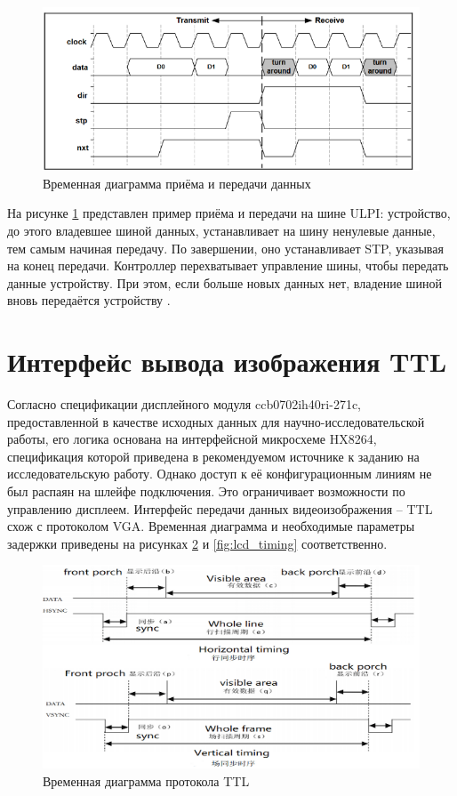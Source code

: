 \begin{figure}[ht]
    \centering
    \includegraphics[scale=0.5]{res/img/ulpi_in_out.png}
    \caption{Временная диаграмма приёма и передачи данных \cite{ulpi:specification}}
    \label{fig:ulpi_in_out}
\end{figure}

На рисунке \ref{fig:ulpi_in_out} представлен пример приёма и передачи на шине ULPI: устройство, до этого владевшее шиной данных, устанавливает на шину ненулевые данные, тем самым начиная передачу. По завершении, оно устанавливает STP, указывая на конец передачи. Контроллер перехватывает управление шины, чтобы передать данные устройству. При этом, если больше новых данных нет, владение шиной вновь передаётся устройству \cite{ulpi:specification}.

\section{Интерфейс вывода изображения TTL}
Согласно спецификации дисплейного модуля ccb0702ih40ri-271c, предоставленной в качестве исходных данных для научно-исследовательской работы, его логика основана на интерфейсной микросхеме HX8264, спецификация которой приведена в рекомендуемом источнике \cite{lcd:driver} к заданию на исследовательскую работу. Однако доступ к её конфигурационным линиям не был распаян на шлейфе подключения. Это ограничивает возможности по управлению дисплеем.
Интерфейс передачи данных видеоизображения – TTL схож с протоколом VGA. Временная диаграмма и необходимые параметры задержки приведены на рисунках \ref{fig:ttl_timing} и \ref{fig:lcd_timing} соответственно.

\begin{figure}[ht]
    \centering
    \includegraphics[scale=0.5]{res/img/ttl_timing.png}
    \caption{Временная диаграмма протокола TTL \cite{lcd:display}}
    \label{fig:ttl_timing}
\end{figure}

